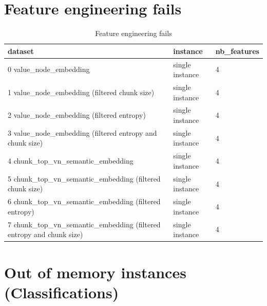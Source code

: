\section{Feature engineering fails}

\label{sec:annexe:feature_engineering_fails}

\begin{table}[H]
\centering
\begin{tabular}{lll}
\hline
dataset & instance & nb\_features \\ 
\hline
0 value\_node\_embedding & single instance & 4 \\ 
1 value\_node\_embedding (filtered chunk size) & single instance & 4 \\ 
2 value\_node\_embedding (filtered entropy) & single instance & 4 \\ 
3 value\_node\_embedding (filtered entropy and chunk size) & single instance & 4 \\ 
4 chunk\_top\_vn\_semantic\_embedding & single instance & 4 \\ 
5 chunk\_top\_vn\_semantic\_embedding (filtered chunk size) & single instance & 4 \\ 
6 chunk\_top\_vn\_semantic\_embedding (filtered entropy) & single instance & 4 \\ 
7 chunk\_top\_vn\_semantic\_embedding (filtered entropy and chunk size) & single instance & 4 \\ 
\hline
\end{tabular}
\caption{Feature engineering fails}
\label{tab:feature_engineering_fails}
\end{table}

\section{Out of memory instances (Classifications)}

\label{sec:annexe:out_of_memory_instances_classifications}

